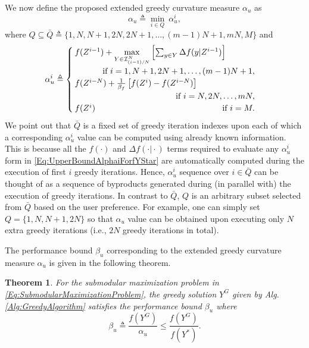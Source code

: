 \documentclass[letterpaper, 10 pt, conference]{ieeeconf}
\newtheorem{theorem}{Theorem}
\begin{document}
{%
We now define the proposed extended greedy curvature measure $\alpha_u$ as 
\begin{equation}\label{Eq:ExtGreedyCurvatureMeasure}
    \alpha_u \triangleq \min_{i \in Q}\ \alpha^i_u,
\end{equation}
where $Q \subseteq \bar{Q} \triangleq \{1,N,N+1,2N,2N+1,\ldots,(m-1)N+1,mN,M\}$ and
\begin{equation}\label{Eq:UpperBoundAlphaiForfYStar}
    \alpha^i_u \triangleq 
    \begin{cases}
     f(Z^{i-1}) + \underset{Y\in\mathcal{I}^N_{(i-1)/N}}{\max} \left[ \sum_{y\in Y} \Delta f(y \vert Z^{i-1})\right]\\
     \ \ \ \ \ \ \ \ \ \ \mbox{if }i=1,N+1,2N+1,\ldots, (m-1)N+1,\\
     f(Z^{i-N}) + \frac{1}{\beta_f}\left[ f(Z^i) - f(Z^{i-N}) \right]\\
     \hfill \mbox{if }i=N,2N,\ldots, mN,\\
     f(Z^i) \hfill \mbox{if }i=M. 
    \end{cases}
\end{equation}
We point out that $\bar{Q}$ is a fixed set of greedy iteration indexes upon each of which a corresponding $\alpha^i_u$ value can be computed using already known information. This is because all the $f(\cdot)$ and $\Delta f(\cdot \vert \cdot)$ terms required to evaluate any $\alpha^i_u$ form in \eqref{Eq:UpperBoundAlphaiForfYStar} are automatically computed during the execution of first $i$ greedy iterations. Hence, $\alpha^i_u$ sequence over $i\in \bar{Q}$ can be thought of as a sequence of byproducts generated during (in parallel with) the execution of greedy iterations. In contrast to $\bar{Q}$, $Q$ is an arbitrary subset selected from $\bar{Q}$ based on the user preference. For example, one can simply set $Q=\{1,N,N+1,2N\}$ so that $\alpha_u$ value can be obtained upon executing only $N$ extra greedy iterations (i.e., $2N$ greedy iterations in total).   

The performance bound $\beta_u$ corresponding to the extended greedy curvature measure $\alpha_u$ is given in the following theorem.


\begin{theorem}\label{Th:MainTheorem}
For the submodular maximization problem in \eqref{Eq:SubmodularMaximizationProblem}, the greedy solution $Y^G$ given by Alg. \ref{Alg:GreedyAlgorithm} satisfies the performance bound $\beta_u$ where 
\begin{equation}\label{Eq:Th:MainTheorem}
\beta_u \triangleq \frac{f(Y^G)}{\alpha_u} \leq \frac{f(Y^G)}{f(Y^*)}. 
\end{equation}



\end{theorem}}
\end{document}
